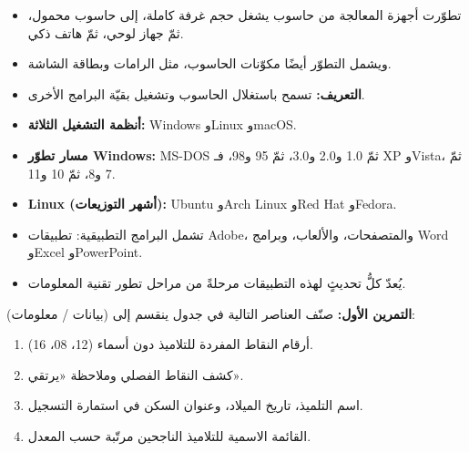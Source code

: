 \documentclass[11pt, a4paper]{article}
\begin{document}

\begin{rememberbox}
  \begin{itemize}[label=\textbullet, leftmargin=1.1em, itemsep=2pt, topsep=1pt, parsep=0pt]
    \item تطوّرت أجهزة المعالجة من حاسوب يشغل حجم غرفة كاملة، إلى حاسوب محمول، ثمّ جهاز لوحي، ثمّ هاتف ذكي.
    \item ويشمل التطوّر أيضًا مكوّنات الحاسوب، مثل الرامات وبطاقة الشاشة.
  \end{itemize}
\end{rememberbox}

\begin{rememberbox}
  \begin{itemize}[label=\textbullet, leftmargin=1.1em, itemsep=2pt, topsep=1pt, parsep=0pt]
    \item \textbf{التعريف:} تسمح باستغلال الحاسوب وتشغيل بقيّة البرامج الأخرى.
    \item \textbf{أنظمة التشغيل الثلاثة:} Windows وLinux وmacOS.
    \item \textbf{مسار تطوّر Windows:} MS-DOS ثمّ 1.0 و2.0 و3.0، ثمّ 95 و98، فـ XP وVista، ثمّ 7 و8، ثمّ 10 و11.
    \item \textbf{Linux (أشهر التوزيعات):} Ubuntu وArch Linux وRed Hat وFedora.
  \end{itemize}
\end{rememberbox}

\begin{rememberbox}
  \begin{itemize}[label=\textbullet, leftmargin=1.1em, itemsep=2pt, topsep=1pt, parsep=0pt]
    \item تشمل البرامج التطبيقية: تطبيقات Adobe، والمتصفحات، والألعاب، وبرامج Word وExcel وPowerPoint.
    \item يُعدّ كلُّ تحديثٍ لهذه التطبيقات مرحلةً من مراحل تطور تقنية المعلومات.
  \end{itemize}
\end{rememberbox}


\textbf{\color{primary}التمرين الأول:} صنّف العناصر التالية في جدول ينقسم إلى (بيانات / معلومات):
\begin{enumerate}[label=\arabic*., leftmargin=1.4em, itemsep=2pt, topsep=2pt, parsep=0pt]
  \item أرقام النقاط المفردة للتلاميذ دون أسماء (12، 08، 16).
  \item كشف النقاط الفصلي وملاحظة «يرتقي».
  \item اسم التلميذ، تاريخ الميلاد، وعنوان السكن في استمارة التسجيل.
  \item القائمة الاسمية للتلاميذ الناجحين مرتّبة حسب المعدل.
\end{enumerate}
\end{document}
